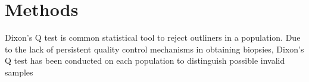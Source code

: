 \chapter{Methods}

Dixon's Q test is common statistical tool to reject outliners in a population. Due to the lack of persistent quality control mechanisms in obtaining biopsies, Dixon's Q test has been conducted on each population to distinguish possible invalid samples